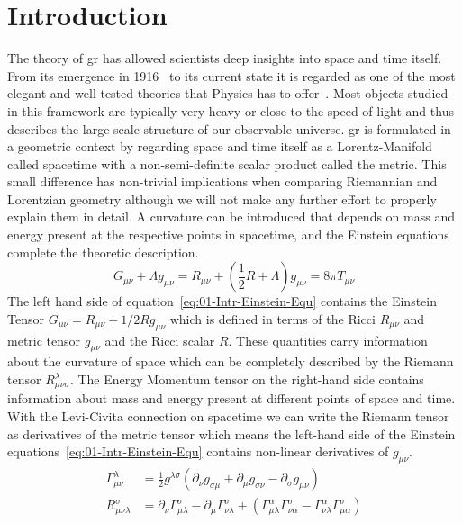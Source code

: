 \section{Introduction}
\label{sec:01-Introduction}
The theory of \ac{gr} has allowed scientists deep insights into space and time itself.
From its emergence in 1916~\cite{einsteinGrundlageAllgemeinenRelativitaetstheorie1916a} to its current state it is regarded as one of the most elegant and well tested theories that Physics has to offer~\cite{hafeleAroundtheWorldAtomicClocks1972, vessotTestRelativisticGravitation1980a, battatApachePointObservatory2009}.
Most objects studied in this framework are typically very heavy or close to the speed of light and thus describes the large scale structure of our observable universe.
\ac{gr} is formulated in a geometric context by regarding space and time itself as a Lorentz-Manifold called spacetime with a non-semi-definite scalar product called the metric.
This small difference has non-trivial implications when comparing Riemannian and Lorentzian geometry although we will not make any further effort to properly explain them in detail.
A curvature can be introduced that depends on mass and energy present at the respective points in spacetime, and the Einstein equations~\cite{einsteinFeldgleichungenGravitation1915} complete the theoretic description.
\begin{equation}
	G_{\mu\nu}+\Lambda g_{\mu\nu} = R_{\mu\nu} + \left(\frac{1}{2}R+\Lambda\right)g_{\mu\nu}=8\pi T_{\mu\nu}
	\label{eq:01-Intr-Einstein-Equ}
\end{equation}
The left hand side of equation~\ref{eq:01-Intr-Einstein-Equ} contains the Einstein Tensor $G_{\mu\nu}=R_{\mu\nu}+1/2Rg_{\mu\nu}$ which is defined in terms of the Ricci $R_{\mu\nu}$ and metric tensor $g_{\mu\nu}$ and the Ricci scalar $R$.
These quantities carry information about the curvature of space which can be completely described by the Riemann tensor $R_{\mu\nu\sigma}^\lambda$.
The Energy Momentum tensor on the right-hand side contains information about mass and energy present at different points of space and time.
With the Levi-Civita connection on spacetime we can write the Riemann tensor as derivatives of the metric tensor which means the left-hand side of the Einstein equations~\ref{eq:01-Intr-Einstein-Equ} contains non-linear derivatives of $g_{\mu\nu}$.
\begin{align}
	\Gamma_{\mu\nu}^{\lambda} &= \frac{1}{2} g^{\lambda\sigma}\left(\partial_{\nu} g_{\sigma\mu}+\partial_{\mu} g_{\sigma\nu}-\partial_{\sigma} g_{\mu \nu}\right)
	\label{eq:01-Intr-Riemann-Tensor-Levi-Civita-Metric-Derivatives-1}\\
	R_{\mu\nu\lambda}^{\sigma} &=\partial_\nu \Gamma_{\mu\lambda}^{\sigma}-\partial_\mu \Gamma_{\nu\lambda}^{\sigma}+\left(\Gamma_{\mu\lambda}^{\alpha} \Gamma_{\nu \alpha}^{\sigma}-\Gamma_{\nu\lambda}^{\alpha} \Gamma_{\mu \alpha}^{\sigma}\right)
	\label{eq:01-Intr-Riemann-Tensor-Levi-Civita-Metric-Derivatives-2}
\end{align}
